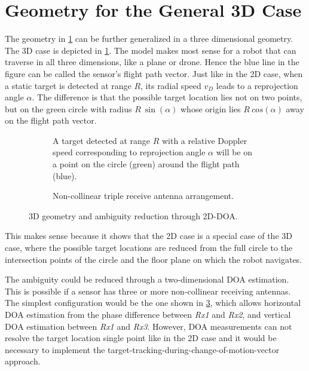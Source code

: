 \section{Geometry for the General 3D Case}\label{geometry-for-the-general-case}

The geometry in \cref{geometry-for-the-general-case} can be further generalized in a three dimensional geometry. The 3D case is depicted in \cref{fig:3dcase}. The model makes most sense for a robot that can traverse in all three dimensions, like a plane or drone. Hence the blue line in the figure can be called the sensor's flight path vector. Just like in the 2D case, when a static target is detected at range $R$, its radial speed $v_D$ leads to a reprojection angle $\alpha$. The difference is that the possible target location lies not on two points, but on the green circle with radius $R~\sin(\alpha)$ whose origin lies $R~cos(\alpha)$ away on the flight path vector.

\begin{figure}[htp]
    \begin{subfigure}[t]{.475\textwidth}
        \centering
        \def\svgwidth{5cm}
        
        \caption{A target detected at range \(R\) with a relative Doppler speed corresponding to reprojection angle \(\alpha\) will be on a point on the circle (green) around the flight path (blue).}
        \label{fig:3dcase}
    \end{subfigure}%
    \hfill%
    \begin{subfigure}[t]{.475\textwidth}
        \centering
        \def\svgwidth{5cm}
        
        \caption{Non-collinear triple receive antenna arrangement.}
        \label{fig:2ddoa}
    \end{subfigure}
    \caption{3D geometry and ambiguity reduction through 2D-DOA.}
\end{figure}

This makes sense because it shows that the 2D case is a special case of the 3D case, where the possible target locations are reduced from the full circle to the intersection points of the circle and the floor plane on which the robot navigates.

The ambiguity could be reduced through a two-dimensional DOA estimation. This is possible if a sensor has three or more non-collinear receiving antennas. The simplest configuration would be the one shown in \cref{fig:2ddoa}, which allows horizontal DOA estimation from the phase difference between \textit{Rx1} and \textit{Rx2}, and vertical DOA estimation between \textit{Rx1} and \textit{Rx3}. However, DOA measurements can not resolve the target location single point like in the 2D case and it would be necessary to implement the target-tracking-during-change-of-motion-vector approach.

